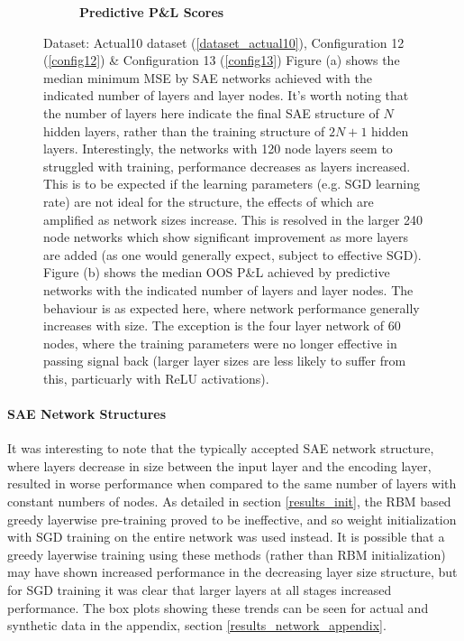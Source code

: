 \documentclass[a4paper,11pt,oneside]{article}
\theoremstyle{plain}
\theoremstyle{definition}
\begin{document}
\begin{figure}[H]
\begin{subfigure}{.5\textwidth}
		\caption{\textbf{Predictive P\&L Scores} 
			\newline }
		\label{figure-actual_pl_lines}
	\end{subfigure}
	\caption[Network Performance by Size]{Dataset: Actual10 dataset (\ref{dataset_actual10}), Configuration 12 (\ref{config12}) \& Configuration 13 (\ref{config13})
		\newline Figure (a) shows the median minimum MSE by SAE networks achieved with the indicated number of layers and layer nodes. It's worth noting that the number of layers here indicate the final SAE structure of $N$ hidden layers, rather than the training structure of $2N + 1$ hidden layers. Interestingly, the networks with 120 node layers seem to struggled with training, performance decreases as layers increased. This is to be expected if the learning parameters (e.g. SGD  learning rate) are not ideal for the structure, the effects of which are amplified as network sizes increase. This is resolved in the larger 240 node networks which show significant improvement as more layers are added (as one would generally expect, subject to effective SGD).
		\newline Figure (b) shows the median OOS P\&L achieved by predictive networks with the indicated number of layers and layer nodes. The behaviour is as expected here, where network performance generally increases with size. The exception is the four layer network of 60 nodes, where the training parameters were no longer effective in passing signal back (larger layer sizes are less likely to suffer from this, particuarly with ReLU activations).
	}
	\label{figure-network_size}
\end{figure}

\paragraph{SAE Network Structures}

It was interesting to note that the typically accepted SAE network structure, where layers decrease in size between the input layer and the encoding layer, resulted in worse performance when compared to the same number of layers with constant numbers of nodes. As detailed in section \ref{results_init}, the RBM based greedy layerwise pre-training proved to be ineffective, and so weight initialization with SGD training on the entire network was used instead. It is possible that a greedy layerwise training using these methods (rather than RBM initialization) may have shown increased performance in the decreasing layer size structure, but for SGD training it was clear that larger layers at all stages increased performance. The box plots showing these trends can be seen for actual and synthetic data in the appendix, section \ref{results_network_appendix}.
\end{document}
